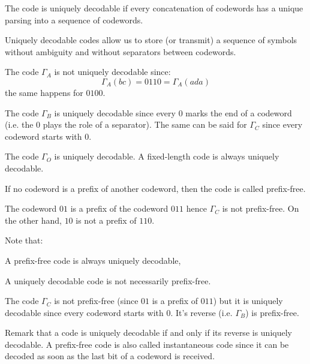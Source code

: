 \begin{definition}
    The code is uniquely decodable if every concatenation of codewords has a unique parsing into a sequence of codewords.
\end{definition}
Uniquely decodable codes allow us to store (or transmit) a sequence of symbols without ambiguity and without separators between codewords.

\begin{eg}
    The code $\Gamma_A$ is not uniquely decodable since:
    \[
        \Gamma_A(bc) = 0110 = \Gamma_A(ada)
    \]
    the same happens for $0100$.
\end{eg}

\begin{eg}
    The code $\Gamma_B$ is uniquely decodable since every $0$ marks the end of a codeword (i.e. the $0$ plays the role of a separator). The same can be said for $\Gamma_C$ since every codeword starts with $0$.
\end{eg}

\begin{eg}
    The code $\Gamma_O$ is uniquely decodable. A fixed-length code is always uniquely decodable.
\end{eg}

\begin{definition}
    If no codeword is a prefix of another codeword, then the code is called prefix-free.
\end{definition}

\begin{eg}
    The codeword $01$ is a prefix of the codeword $011$ hence $\Gamma_C$ is not prefix-free. On the other hand, $10$ is not a prefix of $110$.
\end{eg}
Note that:
\begin{citemize}
    \item A prefix-free code is always uniquely decodable,
    \item A uniquely decodable code is not necessarily prefix-free.
\end{citemize}

\begin{eg}
    The code $\Gamma_C$ is not prefix-free (since $01$ is a prefix of $011$) but it is uniquely decodable since every codeword starts with $0$. It's reverse (i.e. $\Gamma_B$) is prefix-free.
\end{eg}
Remark that a code is uniquely decodable if and only if its reverse is uniquely decodable. A prefix-free code is also called instantaneous code since it can be decoded as soon as the last bit of a codeword is received. 

